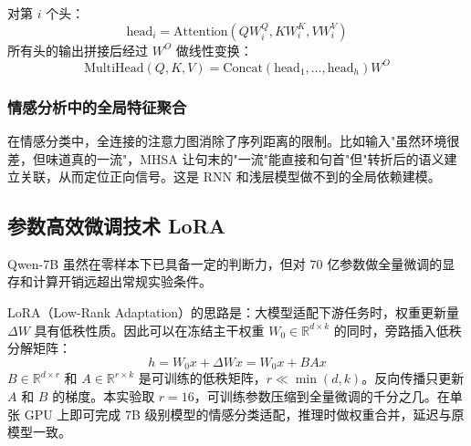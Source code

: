 对第 $i$ 个头：
\begin{equation}
	\text{head}_i = \text{Attention}(Q W_i^Q, K W_i^K, V W_i^V)
\end{equation}
所有头的输出拼接后经过 $W^O$ 做线性变换：
\begin{equation}
	\text{MultiHead}(Q, K, V) = \text{Concat}(\text{head}_1, \dots, \text{head}_h) W^O
\end{equation}

\subsubsection{情感分析中的全局特征聚合}
在情感分类中，全连接的注意力图消除了序列距离的限制。比如输入"虽然环境很差，但味道真的一流"，MHSA 让句末的"一流"能直接和句首"但"转折后的语义建立关联，从而定位正向信号。这是 RNN 和浅层模型做不到的全局依赖建模。

\subsection{参数高效微调技术 LoRA}
Qwen-7B 虽然在零样本下已具备一定的判断力，但对 70 亿参数做全量微调的显存和计算开销远超出常规实验条件。

LoRA（Low-Rank Adaptation）的思路是：大模型适配下游任务时，权重更新量 $\Delta W$ 具有低秩性质。因此可以在冻结主干权重 $W_0 \in \mathbb{R}^{d \times k}$ 的同时，旁路插入低秩分解矩阵：
\begin{equation}
	h = W_0 x + \Delta W x = W_0 x + B A x
\end{equation}
$B \in \mathbb{R}^{d \times r}$ 和 $A \in \mathbb{R}^{r \times k}$ 是可训练的低秩矩阵，$r \ll \min(d, k)$。反向传播只更新 $A$ 和 $B$ 的梯度。本实验取 $r=16$，可训练参数压缩到全量微调的千分之几。在单张 GPU 上即可完成 7B 级别模型的情感分类适配，推理时做权重合并，延迟与原模型一致。

